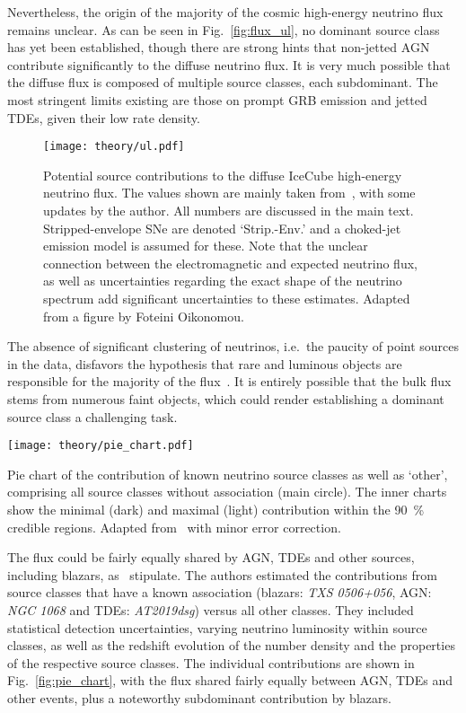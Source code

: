 Nevertheless, the origin of the majority of the cosmic high-energy neutrino flux remains unclear. As can be seen in Fig.~\ref{fig:flux_ul}, no dominant source class has yet been established, though there are strong hints that non-jetted AGN contribute significantly to the diffuse neutrino flux. It is very much possible that the diffuse flux is composed of multiple source classes, each subdominant. The most stringent limits existing are those on prompt GRB emission and jetted TDEs, given their low rate density.

\begin{figure}[htb]
    \texttt{[image: theory/ul.pdf]}
    \caption[Contribution to HE neutrino flux]{Potential source contributions to the diffuse IceCube high-energy neutrino flux. The values shown are mainly taken from~\cite{Guepin2022}, with some updates by the author. All numbers are discussed in the main text. Stripped-envelope SNe are denoted `Strip.-Env.' and a choked-jet emission model is assumed for these. Note that the unclear connection between the electromagnetic and expected neutrino flux, as well as uncertainties regarding the exact shape of the neutrino spectrum add significant uncertainties to these estimates. Adapted from a figure by Foteini Oikonomou.}
\end{figure}

The absence of significant clustering of neutrinos, i.e.~the paucity of point sources in the data, disfavors the hypothesis that rare and luminous objects are responsible for the majority of the flux~. It is entirely possible that the bulk flux stems from numerous faint objects, which could render establishing a dominant source class a challenging task.

\begin{marginfigure}
    \texttt{[image: theory/pie\_chart.pdf]}
    \caption[Neutrino flux contribution pie chart]{Pie chart of the contribution of known neutrino source classes as well as `other', comprising all source classes without association (main circle). The inner charts show the minimal (dark) and maximal (light) contribution within the \SI{90}{\percent} credible regions. Adapted from~\cite{Bartos2021} with minor error correction.}
\end{marginfigure}

The flux could be fairly equally shared by AGN, TDEs and other sources, including blazars, as~ stipulate. The authors estimated the contributions from source classes that have a known association (blazars: \emph{TXS 0506+056}, AGN: \emph{NGC 1068} and TDEs: \emph{AT2019dsg}) versus all other classes. They included statistical detection uncertainties, varying neutrino luminosity within source classes, as well as the redshift evolution of the number density and the properties of the respective source classes. The individual contributions are shown in Fig.~\ref{fig:pie_chart}, with the flux shared fairly equally between AGN, TDEs and other events, plus a noteworthy subdominant contribution by blazars.

